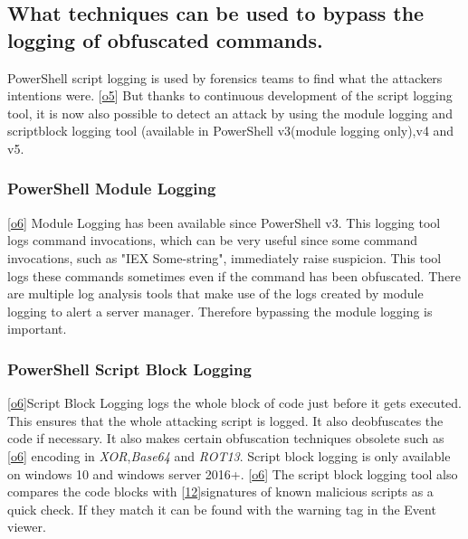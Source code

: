 \documentclass{article}%
\begin{document}
\subsection{What techniques can be used to bypass the logging of obfuscated commands.}
PowerShell script logging is used by forensics teams to find what the attackers intentions were. [\hyperlink{o5}{o5}] But thanks to continuous development of the script logging tool, it is now also possible to detect an attack by using the module logging and scriptblock logging tool (available in PowerShell v3(module logging only),v4 and  v5.
\subsubsection{PowerShell Module Logging}
[\hyperlink{o6}{o6}] Module Logging has been available since PowerShell v3. This logging tool logs command invocations, which can be very useful since some command invocations, such as "IEX Some-string", immediately raise suspicion. This tool logs these commands sometimes even if the command has been obfuscated. There are multiple log analysis tools that make use of the logs created by module logging to alert a server manager. Therefore bypassing the module logging is important.
\subsubsection{PowerShell Script Block Logging}
[\hyperlink{o6}{o6}]Script Block Logging logs the whole block of code just before it gets executed. This ensures that the whole attacking script is logged. It also deobfuscates the code if necessary. It also makes certain obfuscation techniques obsolete such as [\hyperlink{o6}{o6}] encoding in \textit{XOR},\textit{Base64} and \textit{ROT13}. Script block logging is only available on windows 10 and windows server 2016+. [\hyperlink{o6}{o6}] The script block logging tool also compares the code blocks with [\hyperlink{12}{12}]signatures of known malicious scripts as a quick check. If they match it can be found with the warning tag in the Event viewer.
\end{document}
